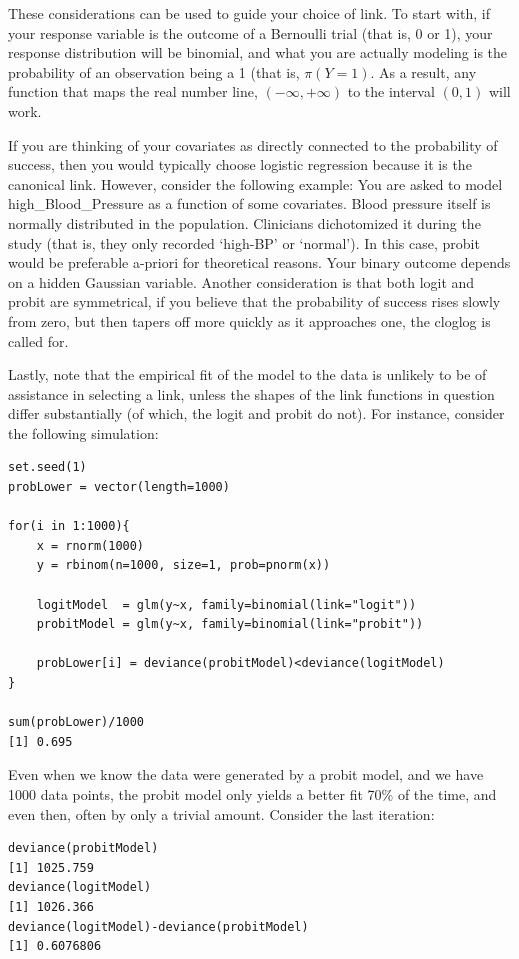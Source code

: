 \documentclass[
]{book}
\begin{document}
These considerations can be used to guide your choice of link.
To start with, if your response variable is the outcome of a Bernoulli trial (that is, 0 or 1),
your response distribution will be binomial,
and what you are actually modeling is the probability of an observation being a 1
(that is, \(π(Y=1)\).
As a result, any function that maps the real number line, \((−∞,+∞)\)
to the interval \((0,1)\) will work.

If you are thinking of your covariates as directly connected to the probability of success,
then you would typically choose logistic regression
because it is the canonical link.
However, consider the following example:
You are asked to model high\_Blood\_Pressure as a function of some covariates.
Blood pressure itself is normally distributed in the population.
Clinicians dichotomized it during the study
(that is, they only recorded `high-BP' or `normal').
In this case, probit would be preferable a-priori for theoretical reasons.
Your binary outcome depends on a hidden Gaussian variable.
Another consideration is that both logit and probit are symmetrical,
if you believe that the probability of success rises slowly from zero,
but then tapers off more quickly as it approaches one, the cloglog is called for.

Lastly, note that the empirical fit of the model to the data is
unlikely to be of assistance in selecting a link,
unless the shapes of the link functions in question differ substantially
(of which, the logit and probit do not).
For instance, consider the following simulation:

\begin{verbatim}
set.seed(1)
probLower = vector(length=1000)

for(i in 1:1000){      
    x = rnorm(1000)
    y = rbinom(n=1000, size=1, prob=pnorm(x))

    logitModel  = glm(y~x, family=binomial(link="logit"))
    probitModel = glm(y~x, family=binomial(link="probit"))

    probLower[i] = deviance(probitModel)<deviance(logitModel)
}

sum(probLower)/1000
[1] 0.695
\end{verbatim}

Even when we know the data were generated by a probit model, and we have 1000 data points,
the probit model only yields a better fit 70\% of the time, and even then,
often by only a trivial amount.
Consider the last iteration:

\begin{verbatim}
deviance(probitModel)
[1] 1025.759
deviance(logitModel)
[1] 1026.366
deviance(logitModel)-deviance(probitModel)
[1] 0.6076806
\end{verbatim}
\end{document}
